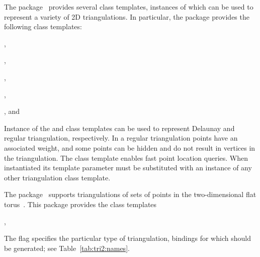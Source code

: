 The \iiDTriangulationsPackage{} package~\cite{cgal:y-t2-21a}
provides several class templates, instances of which can be used to
represent a variety of 2D triangulations. In particular, the package
provides the following class templates:
\begin{compactenum}
\item {},
\item {},
\item {},
\item {},
\item {}, and
\item {}
\end{compactenum}
Instance of the  and
 class templates can be used
to represent Delaunay and regular triangulation, respectively. In a
regular triangulation points have an associated weight, and some
points can be hidden and do not result in vertices in the
triangulation. The class template
 enables fast point location
queries. When instantiated its template parameter must be substituted
with an instance of any other triangulation class template.

The \iiDPeriodicTriangulationsPackage{}
package~\cite{cgal:k-pt2-13-21a} supports triangulations of sets of
points in the two-dimensional flat torus~\cite{ct-cpt-09}. This
package provides the class templates
\begin{compactenum}
\item {},
\item {}
\item {}
\end{compactenum}

The \cmake{} flag  specifies the particular
type of triangulation, bindings for which should be generated; see
Table~\ref{tab:tri2:names}.

